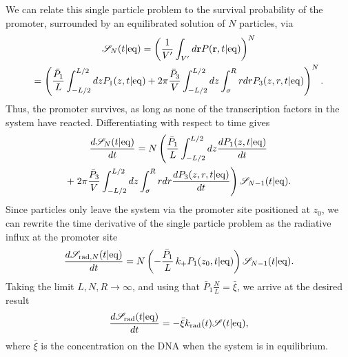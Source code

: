 We can relate this single particle problem to the survival probability of the promoter, surrounded by an equilibrated solution of $N$ particles, via \cite{Szabo1989} 
\begin{gather}
 \mathscr{S}_{N}(t|{\rm eq}) = \left( \frac{1}{V'} \int_{V'} d{\bf r} P({\bf r}, t|{\rm eq})\right)^N \\ 
 = \left( \frac{\bar{P}_1}{L} \int_{-L/2}^{L/2}dz P_1(z,t|{\rm eq }) + 2\pi \frac{\bar{P}_3}{V} \int_{-L/2}^{L/2}dz \int_{\sigma}^{R}rdr P_3(z,r,t|{\rm eq}) \right)^N.
\end{gather}
Thus, the promoter survives, as long as none of the transcription factors in the system have reacted. Differentiating with respect to time gives
\begin{multline}
 \frac{d\mathscr{S}_{N}(t|{\rm eq})}{dt} = N \left( \frac{\bar{P}_1}{L} \int_{-L/2}^{L/2}dz  \frac{dP_1(z,t|{\rm eq})}{dt} \right. \\ +  \left. 2\pi \frac{\bar{P}_3}{V} \int_{-L/2}^{L/2}dz \int_{\sigma}^{R}rdr \frac{dP_3(z,r,t|{\rm eq})}{dt} \right) \mathscr{S}_{N-1}(t|{\rm eq}).
\end{multline}
Since particles only leave the system via the promoter site positioned at $z_0$, we can rewrite the time derivative of the single particle problem as the radiative influx at the promoter site
\begin{equation}
 \frac{d\mathscr{S}_{{\rm rad}, N}(t|{\rm eq})}{dt} = N \left( -\frac{\bar{P}_1}{L} \, k_+ P_1(z_0,t|{\rm eq}) \right) \mathscr{S}_{N-1}(t|{\rm eq}).
\end{equation}
Taking the limit $L,N,R \to \infty$, and using that $\bar{P}_1 \frac{N}{L} = \bar{\xi}$, we arrive at the desired result
\begin{equation}
 \frac{d\mathscr{S}_{{\rm rad}}(t|{\rm eq})}{dt} = - \bar{\xi} k_{\rm rad}(t) \mathscr{S}(t|{\rm eq}),
\end{equation}
where $\bar{\xi}$ is the concentration on the DNA when the system is in equilibrium.













